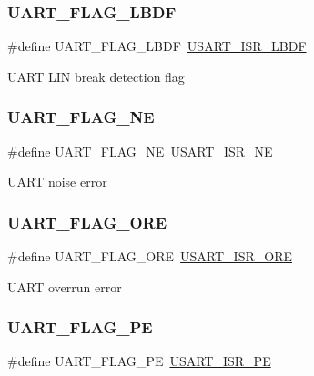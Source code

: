 \subsubsection{\texorpdfstring{UART\_FLAG\_LBDF}{UART\_FLAG\_LBDF}}
{\footnotesize\ttfamily \#define U\+A\+R\+T\+\_\+\+F\+L\+A\+G\+\_\+\+L\+B\+DF~\mbox{\hyperlink{group___peripheral___registers___bits___definition_gaf00a820cca1d3bb31f9f4f602f070c44}{U\+S\+A\+R\+T\+\_\+\+I\+S\+R\+\_\+\+L\+B\+DF}}}

U\+A\+RT L\+IN break detection flag \mbox{\label{group___u_a_r_t___flags_ga665981434d02ff5296361782c1a7d4b5}} 
\subsubsection{\texorpdfstring{UART\_FLAG\_NE}{UART\_FLAG\_NE}}
{\footnotesize\ttfamily \#define U\+A\+R\+T\+\_\+\+F\+L\+A\+G\+\_\+\+NE~\mbox{\hyperlink{group___peripheral___registers___bits___definition_ga09c7d19477a091689f50bd0ef5b6a3d8}{U\+S\+A\+R\+T\+\_\+\+I\+S\+R\+\_\+\+NE}}}

U\+A\+RT noise error \mbox{\label{group___u_a_r_t___flags_ga335a5b0f61512223bbc406b38c95b2d6}} 
\subsubsection{\texorpdfstring{UART\_FLAG\_ORE}{UART\_FLAG\_ORE}}
{\footnotesize\ttfamily \#define U\+A\+R\+T\+\_\+\+F\+L\+A\+G\+\_\+\+O\+RE~\mbox{\hyperlink{group___peripheral___registers___bits___definition_ga9e5b4a08e3655bed8ec3022947cfc542}{U\+S\+A\+R\+T\+\_\+\+I\+S\+R\+\_\+\+O\+RE}}}

U\+A\+RT overrun error \mbox{\label{group___u_a_r_t___flags_gad5b96f73f6d3a0b58f07e2e9d7bf14d9}} 
\subsubsection{\texorpdfstring{UART\_FLAG\_PE}{UART\_FLAG\_PE}}
{\footnotesize\ttfamily \#define U\+A\+R\+T\+\_\+\+F\+L\+A\+G\+\_\+\+PE~\mbox{\hyperlink{group___peripheral___registers___bits___definition_gaa10e69d231b67d698ab59db3d338baa6}{U\+S\+A\+R\+T\+\_\+\+I\+S\+R\+\_\+\+PE}}}

